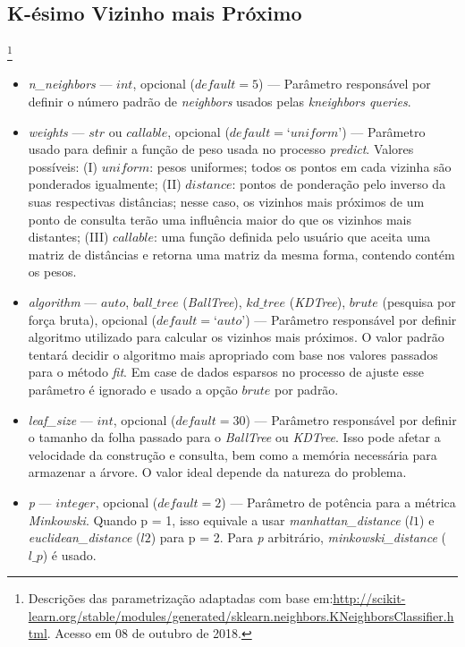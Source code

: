 \documentclass[
	12pt,				%
	oneside,			%
	a4paper,			%
	english,			%
	brazil				%
	]{abntex2ppgsi}
\begin{document}
{{{\begin{apendicesenv}
\section{K-ésimo Vizinho mais Próximo}\footnote{Descrições das parametrização adaptadas com base em:\url{http://scikit-learn.org/stable/modules/generated/sklearn.neighbors.KNeighborsClassifier.html}. Acesso em 08 de outubro de 2018.}

\begin{itemize}

\item \textit{n\_neighbors} --- $int$, opcional ($default = 5$) --- Parâmetro responsável por definir o número padrão de \textit{neighbors} usados pelas \textit{kneighbors queries}.

\item \textit{weights} --- $str$ ou $callable$, opcional ($default = ‘uniform’$) --- Parâmetro usado para definir a função de peso usada no processo \textit{predict}. Valores possíveis: (I) $uniform$: pesos uniformes; todos os pontos em cada vizinha são ponderados igualmente; (II) $distance$: pontos de ponderação pelo inverso da suas respectivas distâncias; nesse caso, os vizinhos mais próximos de um ponto de consulta terão uma influência maior do que os vizinhos mais distantes; (III) $callable$: uma função definida pelo usuário que aceita uma matriz de distâncias e retorna uma matriz da mesma forma, contendo contém os pesos.

\item \textit{algorithm} --- $auto$, $ball\_tree$ (\textit{BallTree}), $kd\_tree$ (\textit{KDTree}), $brute$ (pesquisa por força bruta), opcional ($default = ‘auto’$) --- Parâmetro responsável por definir algoritmo utilizado para calcular os vizinhos mais próximos. O valor padrão tentará decidir o algoritmo mais apropriado com base nos valores passados para o método \textit{fit}. Em case de dados esparsos no processo de ajuste esse parâmetro é ignorado e usado a opção $brute$ por padrão.

\item \textit{leaf\_size} --- $int$, opcional ($default = 30$) --- Parâmetro responsável por definir o tamanho da folha passado para o \textit{BallTree} ou \textit{KDTree}. Isso pode afetar a velocidade da construção e consulta, bem como a memória necessária para armazenar a árvore. O valor ideal depende da natureza do problema.

\item \textit{p} --- $integer$, opcional ($default = 2$) --- Parâmetro de potência para a métrica \textit{Minkowski}. Quando p = 1, isso equivale a usar \textit{manhattan\_distance} ($l1$) e \textit{euclidean\_distance} ($l2$) para p = 2. Para \textit{p} arbitrário, \textit{minkowski\_distance} ($l\_p$) é usado.


\end{itemize}
\end{apendicesenv}}}}
\end{document}
